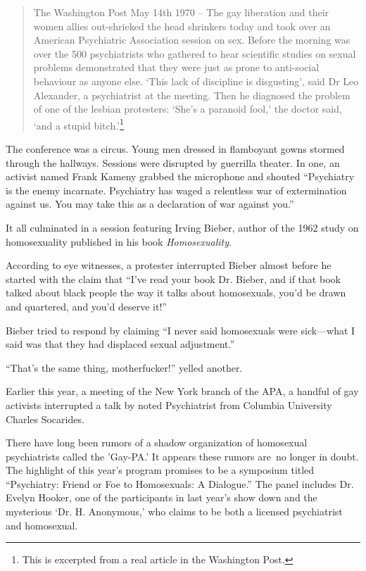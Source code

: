 \begin{refsection}
\begin{quote}

The Washington Post May 14th 1970 -- The gay liberation and their women allies out-shrieked the head shrinkers today and took over an American Psychiatric Association session on sex. Before the morning was over the 500 psychiatrists who gathered to hear scientific studies on sexual problems demonstrated that they were just as prone to anti-social behaviour as anyone else. `This lack of discipline is disgusting', said Dr Leo Alexander, a psychiatrist at the meeting. Then he diagnosed the problem of one of the lesbian protesters: `She's a paranoid fool,' the doctor said, `and a stupid bitch.'\footnote{This is excerpted from a real article in the Washington Post.}
\end{quote}

The conference was a circus. Young men dressed in flamboyant gowns stormed through the hallways. Sessions were disrupted by guerrilla theater. In one, an activist named Frank Kameny grabbed the microphone and shouted “Psychiatry is the enemy incarnate. Psychiatry has waged a relentless war of extermination against us. You may take this as a declaration of war against you.”

It all culminated in a session featuring Irving Bieber, author of the 1962 study on homosexuality published in his book \emph{Homosexuality}.

According to eye witnesses, a protester interrupted Bieber almost before he started with the claim that “I've read your book Dr. Bieber, and if that book talked about black people the way it talks about homosexuals, you'd be drawn and quartered, and you'd deserve it!” ~\citep[p. 200--201]{Clendinen:2013wy} 

Bieber tried to respond by claiming “I never said homosexuals were sick—what I said was that they had displaced sexual adjustment.” 

“That's the same thing, motherfucker!” yelled another.

Earlier this year, a meeting of the New York branch of the APA, a handful of gay activists interrupted a talk by noted Psychiatrist from Columbia University Charles Socarides.

There have long been rumors of a shadow organization of homosexual psychiatrists called the 'Gay-PA.’ It appears these rumors are no longer in doubt. The highlight of this year's program promises to be a symposium titled “Psychiatry: Friend or Foe to Homosexuals: A Dialogue.” The panel includes Dr. Evelyn Hooker, one of the participants in last year's show down and the mysterious `Dr. H. Anonymous,' who claims to be both a licensed psychiatrist and homosexual.


\end{refsection}
